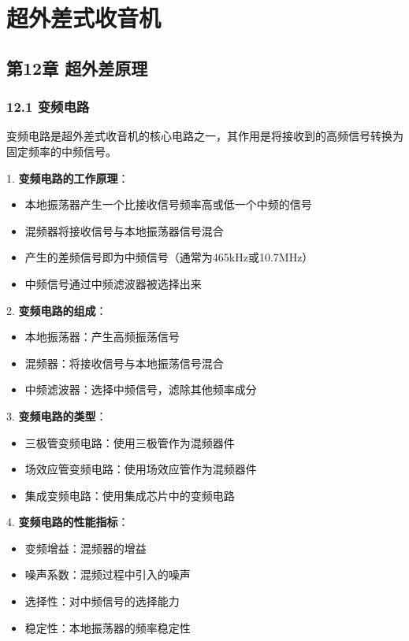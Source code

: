 \documentclass[12pt,UTF8]{ctexbook}
\begin{document}
\part{超外差式收音机}

\chapter*{第12章 超外差原理}
\section*{12.1 变频电路}

变频电路是超外差式收音机的核心电路之一，其作用是将接收到的高频信号转换为固定频率的中频信号。

1. \textbf{变频电路的工作原理}：
   \begin{itemize}[leftmargin=3.5em]
   \item 本地振荡器产生一个比接收信号频率高或低一个中频的信号
   \item 混频器将接收信号与本地振荡器信号混合
   \item 产生的差频信号即为中频信号（通常为465kHz或10.7MHz）
   \item 中频信号通过中频滤波器被选择出来
   \end{itemize}

2. \textbf{变频电路的组成}：
   \begin{itemize}[leftmargin=3.5em]
   \item 本地振荡器：产生高频振荡信号
   \item 混频器：将接收信号与本地振荡信号混合
   \item 中频滤波器：选择中频信号，滤除其他频率成分
   \end{itemize}

3. \textbf{变频电路的类型}：
   \begin{itemize}[leftmargin=3.5em]
   \item 三极管变频电路：使用三极管作为混频器件
   \item 场效应管变频电路：使用场效应管作为混频器件
   \item 集成变频电路：使用集成芯片中的变频电路
   \end{itemize}

4. \textbf{变频电路的性能指标}：
   \begin{itemize}[leftmargin=3.5em]
   \item 变频增益：混频器的增益
   \item 噪声系数：混频过程中引入的噪声
   \item 选择性：对中频信号的选择能力
   \item 稳定性：本地振荡器的频率稳定性
   \end{itemize}
\end{document}
